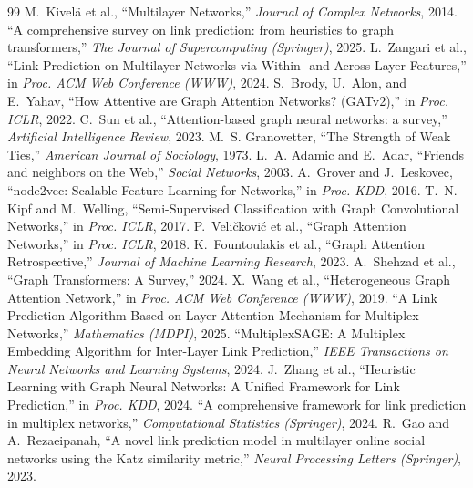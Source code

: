 \documentclass[11pt,a4paper]{article}
\begin{document}
\begin{thebibliography}{99}
 M.~Kivel\"a et al., ``Multilayer Networks,'' \emph{Journal of Complex Networks}, 2014.
 ``A comprehensive survey on link prediction: from heuristics to graph transformers,'' \emph{The Journal of Supercomputing (Springer)}, 2025.
 L.~Zangari et al., ``Link Prediction on Multilayer Networks via Within- and Across-Layer Features,'' in \emph{Proc. ACM Web Conference (WWW)}, 2024.
 S.~Brody, U.~Alon, and E.~Yahav, ``How Attentive are Graph Attention Networks? (GATv2),'' in \emph{Proc. ICLR}, 2022.
 C.~Sun et al., ``Attention-based graph neural networks: a survey,'' \emph{Artificial Intelligence Review}, 2023.
 M.~S. Granovetter, ``The Strength of Weak Ties,'' \emph{American Journal of Sociology}, 1973.
 L.~A. Adamic and E.~Adar, ``Friends and neighbors on the Web,'' \emph{Social Networks}, 2003.
 A.~Grover and J.~Leskovec, ``node2vec: Scalable Feature Learning for Networks,'' in \emph{Proc. KDD}, 2016.
 T.~N. Kipf and M.~Welling, ``Semi-Supervised Classification with Graph Convolutional Networks,'' in \emph{Proc. ICLR}, 2017.
 P.~Veli\v{c}kovi\'{c} et al., ``Graph Attention Networks,'' in \emph{Proc. ICLR}, 2018.
 K.~Fountoulakis et al., ``Graph Attention Retrospective,'' \emph{Journal of Machine Learning Research}, 2023.
 A.~Shehzad et al., ``Graph Transformers: A Survey,'' 2024.
 X.~Wang et al., ``Heterogeneous Graph Attention Network,'' in \emph{Proc. ACM Web Conference (WWW)}, 2019.
 ``A Link Prediction Algorithm Based on Layer Attention Mechanism for Multiplex Networks,'' \emph{Mathematics (MDPI)}, 2025.
 ``MultiplexSAGE: A Multiplex Embedding Algorithm for Inter-Layer Link Prediction,'' \emph{IEEE Transactions on Neural Networks and Learning Systems}, 2024.
 J.~Zhang et al., ``Heuristic Learning with Graph Neural Networks: A Unified Framework for Link Prediction,'' in \emph{Proc. KDD}, 2024.
 ``A comprehensive framework for link prediction in multiplex networks,'' \emph{Computational Statistics (Springer)}, 2024.
 R.~Gao and A.~Rezaeipanah, ``A novel link prediction model in multilayer online social networks using the Katz similarity metric,'' \emph{Neural Processing Letters (Springer)}, 2023.
\end{thebibliography}
\end{document}
